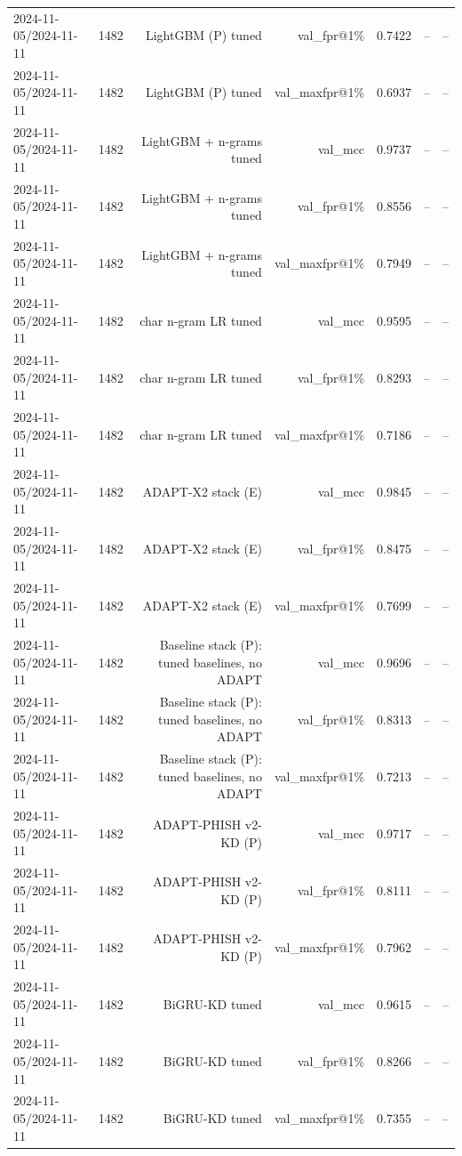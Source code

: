 \begin{table}[t]
\begin{tabular}{llrrrrr}
2024-11-05/2024-11-11 & 1482 & LightGBM (P) tuned & val\_fpr@1\% & 0.7422 & -- & -- \\
2024-11-05/2024-11-11 & 1482 & LightGBM (P) tuned & val\_maxfpr@1\% & 0.6937 & -- & -- \\
2024-11-05/2024-11-11 & 1482 & LightGBM + n-grams tuned & val\_mcc & 0.9737 & -- & -- \\
2024-11-05/2024-11-11 & 1482 & LightGBM + n-grams tuned & val\_fpr@1\% & 0.8556 & -- & -- \\
2024-11-05/2024-11-11 & 1482 & LightGBM + n-grams tuned & val\_maxfpr@1\% & 0.7949 & -- & -- \\
2024-11-05/2024-11-11 & 1482 & char n-gram LR tuned & val\_mcc & 0.9595 & -- & -- \\
2024-11-05/2024-11-11 & 1482 & char n-gram LR tuned & val\_fpr@1\% & 0.8293 & -- & -- \\
2024-11-05/2024-11-11 & 1482 & char n-gram LR tuned & val\_maxfpr@1\% & 0.7186 & -- & -- \\
2024-11-05/2024-11-11 & 1482 & ADAPT-X2 stack (E) & val\_mcc & 0.9845 & -- & -- \\
2024-11-05/2024-11-11 & 1482 & ADAPT-X2 stack (E) & val\_fpr@1\% & 0.8475 & -- & -- \\
2024-11-05/2024-11-11 & 1482 & ADAPT-X2 stack (E) & val\_maxfpr@1\% & 0.7699 & -- & -- \\
2024-11-05/2024-11-11 & 1482 & Baseline stack (P): tuned baselines, no ADAPT & val\_mcc & 0.9696 & -- & -- \\
2024-11-05/2024-11-11 & 1482 & Baseline stack (P): tuned baselines, no ADAPT & val\_fpr@1\% & 0.8313 & -- & -- \\
2024-11-05/2024-11-11 & 1482 & Baseline stack (P): tuned baselines, no ADAPT & val\_maxfpr@1\% & 0.7213 & -- & -- \\
2024-11-05/2024-11-11 & 1482 & ADAPT-PHISH v2-KD (P) & val\_mcc & 0.9717 & -- & -- \\
2024-11-05/2024-11-11 & 1482 & ADAPT-PHISH v2-KD (P) & val\_fpr@1\% & 0.8111 & -- & -- \\
2024-11-05/2024-11-11 & 1482 & ADAPT-PHISH v2-KD (P) & val\_maxfpr@1\% & 0.7962 & -- & -- \\
2024-11-05/2024-11-11 & 1482 & BiGRU-KD tuned & val\_mcc & 0.9615 & -- & -- \\
2024-11-05/2024-11-11 & 1482 & BiGRU-KD tuned & val\_fpr@1\% & 0.8266 & -- & -- \\
2024-11-05/2024-11-11 & 1482 & BiGRU-KD tuned & val\_maxfpr@1\% & 0.7355 & -- & -- \\

\end{tabular}
\end{table}
